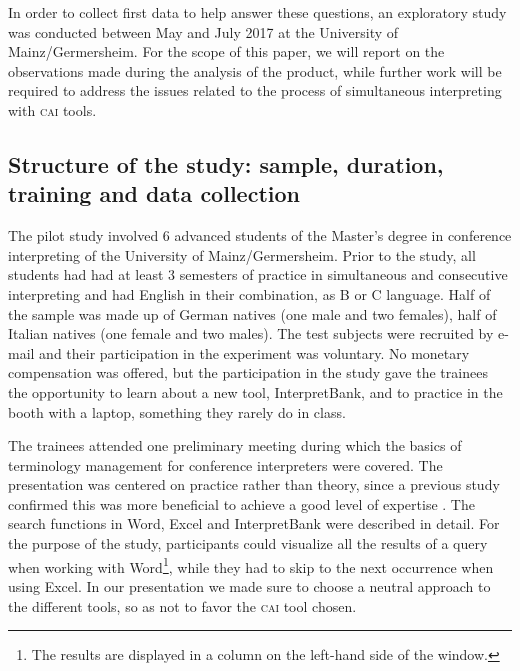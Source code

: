 \documentclass[output=paper]{langsci/langscibook}
\begin{document}
In order to collect first data to help answer these questions, an exploratory study was conducted between May and July 2017 at the University of Mainz\slash Germersheim. For the scope of this paper, we will report on the observations made during the analysis of the product, while further work will be required to address the issues related to the process of simultaneous interpreting with \textsc{cai} tools.

\subsection{Structure of the study: sample, duration, training and data collection}\label{sec:prandi:3.3}
The pilot study involved 6 advanced students of the Master’s degree in conference interpreting of the University of Mainz/Germersheim. Prior to the study, all students had had at least 3 semesters of practice in simultaneous and consecutive interpreting and had English in their combination, as B or C language. Half of the sample was made up of German natives (one male and two females), half of Italian natives (one female and two males). The test subjects were recruited by e-mail and their participation in the experiment was voluntary. No monetary compensation was offered, but the participation in the study gave the trainees the opportunity to learn about a new tool, InterpretBank, and to practice in the booth with a laptop, something they rarely do in class.

The trainees attended one preliminary meeting during which the basics of terminology management for conference interpreters were covered. The presentation was centered on practice rather than theory, since a previous study confirmed this was more beneficial to achieve a good level of expertise \citep{Prandi2015a, Prandi2015b}. The search functions in Word, Excel and InterpretBank were described in detail. For the purpose of the study, participants could visualize all the results of a query when working with Word\footnote{The results are displayed in a column on the left-hand side of the window.}, while they had to skip to the next occurrence when using Excel. In our presentation we made sure to choose a neutral approach to the different tools, so as not to favor the \textsc{cai} tool chosen.
\end{document}
